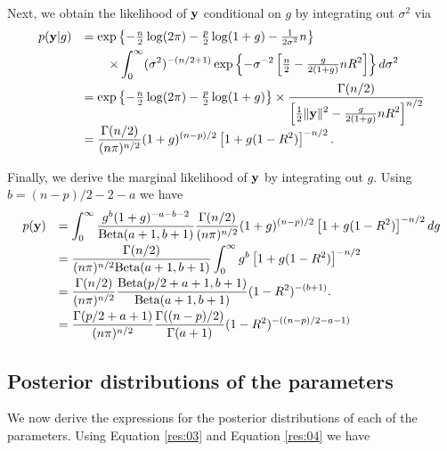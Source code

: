 \documentclass{amsart}[12pt]
\begin{document}
Next, we obtain the likelihood of ${\bf y}$ conditional on $g$ by integrating out $\sigma^2$ via
$$
\begin{array}{rl}
\displaystyle p({\bf y}|g) 
    & \displaystyle = \exp\left\{
    - \tfrac{n}{2}\log(2\pi) - \tfrac{p}{2}\log(1+g) 
    - \tfrac{1}{2\sigma^2}n
    \right\}
    \\ [1ex]
    & \displaystyle \qquad \times 
    \int_0^\infty (\sigma^2)^{-(n/2 + 1)}
    \exp\left\{
    - \sigma^{-2} \left[ \tfrac{n}{2} - \tfrac{g}{2(1+g)} nR^2 \right] 
    \right\} d\sigma^2
    \\ [2ex]
    & \displaystyle = \exp\left\{
    - \tfrac{n}{2}\log(2\pi) - \tfrac{p}{2}\log(1+g)
    \right\}
   \times 
    \frac{\Gamma(n/2)}{\displaystyle \left[ \tfrac{1}{2}\|{\bf y}\|^2 - \tfrac{g}{2(1+g)}nR^2 \right] ^{n/2}}
    \\ [2ex]
& \displaystyle = \frac{\Gamma(n/2)}{(n\pi)^{n/2}} (1 + g)^{(n-p)/2} \left[  1 + g(1 -  R^2) \right] ^{-n/2}.
\end{array}
$$

\noindent Finally, we derive the marginal likelihood of ${\bf y}$ by integrating out $g$. Using $b= (n-p)/2 - 2 - a$ we have
$$
\begin{array}{rl}
\displaystyle p({\bf y}) 
& \displaystyle = \int_0^\infty
\frac{g^{b}(1 + g)^{-a-b-2}}{\mbox{Beta}(a+1,b+1)}
\frac{\Gamma(n/2)}{(n\pi)^{n/2}} (1 + g)^{(n-p)/2} \left[  1 + g(1 -  R^2) \right]^{-n/2}
dg
\\ [2ex]
& \displaystyle = \frac{\Gamma(n/2)}{(n\pi)^{n/2} \mbox{Beta}(a+1,b+1)} 
\int_0^\infty g^{b} \left[  1 + g(1 -  R^2) \right]^{-n/2}
\\ [2ex]
& \displaystyle = \frac{\Gamma(n/2) }{(n\pi)^{n/2}} 
\frac{\mbox{Beta}( p/2 + a + 1,b+1)}{\mbox{Beta}(a+1,b+1)}
(1 -  R^2)^{-(b+1)}.
\\ [2ex]
& \displaystyle  
= \frac{\Gamma( p/2 + a + 1)}{(n\pi)^{n/2}} 
\frac{\Gamma((n-p)/2)}{\Gamma(a+1)} (1 -  R^2)^{-((n-p)/2 - a - 1)} \\
\end{array}
$$

\subsection{Posterior distributions of the parameters}
We now derive the expressions for the posterior distributions of each of the parameters. Using Equation
\ref{res:03} and Equation \ref{res:04} we have
\end{document}
